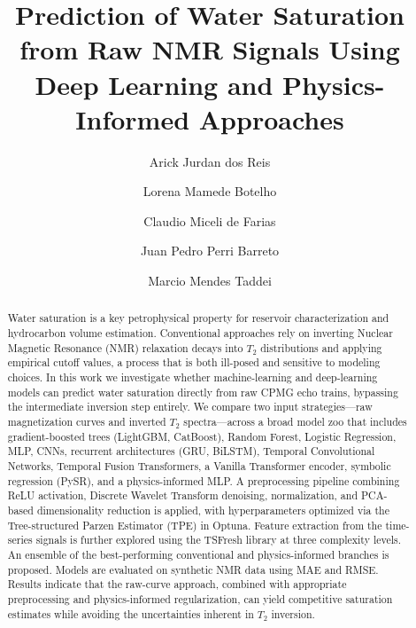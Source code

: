 \documentclass[runningheads]{llncs}
\begin{document}
%
\title{Prediction of Water Saturation from Raw NMR Signals Using Deep Learning and Physics-Informed Approaches}


\author{
Arick Jurdan dos Reis \and
Lorena Mamede Botelho \and
Claudio Miceli de Farias \and
Juan Pedro Perri Barreto \and
Marcio Mendes Taddei
}



\maketitle
%
\begin{abstract}
Water saturation is a key petrophysical property for reservoir characterization and hydrocarbon volume estimation.
Conventional approaches rely on inverting Nuclear Magnetic Resonance (NMR) relaxation decays into $T_2$ distributions
and applying empirical cutoff values, a process that is both ill-posed and sensitive to modeling choices.
In this work we investigate whether machine-learning and deep-learning models can predict water saturation
directly from raw CPMG echo trains, bypassing the intermediate inversion step entirely.
We compare two input strategies---raw magnetization curves and inverted $T_2$ spectra---across a broad model
zoo that includes gradient-boosted trees (LightGBM, CatBoost), Random Forest, Logistic Regression, MLP,
CNNs, recurrent architectures (GRU, BiLSTM), Temporal Convolutional Networks, Temporal Fusion Transformers,
a Vanilla Transformer encoder, symbolic regression (PySR), and a physics-informed MLP.
A preprocessing pipeline combining ReLU activation, Discrete Wavelet Transform denoising,
normalization, and PCA-based dimensionality reduction is applied, with hyperparameters optimized via
the Tree-structured Parzen Estimator (TPE) in Optuna. Feature extraction from the time-series
signals is further explored using the TSFresh library at three complexity levels.
An ensemble of the best-performing conventional and physics-informed branches is proposed.
Models are evaluated on synthetic NMR data using MAE and RMSE.
Results indicate that the raw-curve approach, combined with appropriate preprocessing and
physics-informed regularization, can yield competitive saturation estimates while avoiding the
uncertainties inherent in $T_2$ inversion.

\end{abstract}
\end{document}
